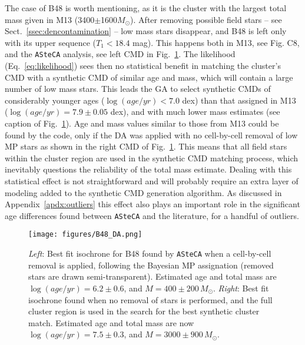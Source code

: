\documentclass[draft]{aa}
\begin{document}
The case of B48 is worth mentioning, as it is the cluster with the largest total
mass given in M13 (3400$\pm$1600$M_{\odot}$).
After removing possible field stars -- see Sect.~\ref{ssec:dencontamination} --
low mass stars disappear, and B48 is left only with its upper sequence 
($T_1<18.4$ mag). This happens both in M13, see Fig. C8, and the
\texttt{ASteCA} analysis, see left CMD in Fig.~\ref{fig:B48_DA}.
%
The likelihood (Eq.~\ref{eq:likelihood}) sees then no statistical benefit in
matching the cluster's CMD with a synthetic CMD of similar age and mass,
which will contain a large number of low mass stars.
This leads the GA to select synthetic CMDs of considerably younger ages
($\log(age/yr){<}7.0$ dex) than that assigned in M13
($\log(age/yr){=}7.9\pm0.05$ dex), and with much lower mass estimates (see
caption of Fig.~\ref{fig:B48_DA}).
%
%
Age and mass values similar to those from M13 could be found by the code, only
if the DA was applied with no cell-by-cell removal of low MP stars as shown in
the right CMD of Fig.~\ref{fig:B48_DA}. This means that all field stars within
the cluster region are used in the synthetic CMD matching process, which
inevitably questions the reliability of the total mass estimate.
%
Dealing with this statistical effect is not straightforward and will probably
require an extra layer of modeling added to the synthetic CMD generation
algorithm.
As discussed in Appendix~\ref{apdx:outliers} this effect also plays an
important role in the significant age differences found between \texttt{ASteCA}
and the literature, for a handful of outliers.

\begin{figure}
\centering
\texttt{[image: figures/B48\_DA.png]}
\caption{\emph{Left}: Best fit isochrone for B48 found by \texttt{ASteCA} when
a cell-by-cell removal is applied, following the Bayesian MP assignation 
(removed stars are drawn semi-transparent). Estimated age and
total mass are $\log(age/yr){=}6.2{\pm}0.6$, and $M{=}400{\pm}200\,M_{\odot}$.
\emph{Right}: Best fit isochrone found when no removal of stars is performed,
and the full cluster region is used in the search for the best synthetic
cluster match. Estimated age and total mass are now
$\log(age/yr){=}7.5{\pm}0.3$, and $M{=}3000{\pm}900\,M_{\odot}$.}
\label{fig:B48_DA}
\end{figure}
\end{document}
